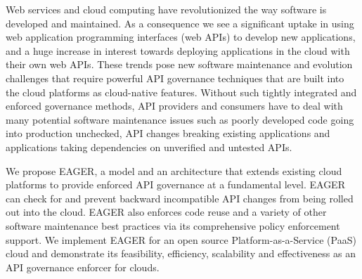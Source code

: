 Web services and cloud computing have
revolutionized the way software is developed and maintained. As a consequence we see
a significant uptake in using web application programming interfaces (web APIs) to develop
new applications, and a huge increase in interest towards deploying applications in the cloud
with their own web APIs. These trends pose new software maintenance and
evolution challenges that require powerful API governance techniques that are
built into the cloud platforms as cloud-native features. Without such tightly integrated 
and enforced governance methods, API providers and consumers have to deal with
many potential software maintenance issues such as poorly developed
code going into production unchecked, API changes breaking existing 
applications and applications taking dependencies on unverified and untested APIs.

We propose EAGER, a model and an architecture that extends existing cloud platforms
to provide enforced API governance at a fundamental level. EAGER can check for and
prevent backward incompatible API changes from being rolled out into the cloud. EAGER
also enforces code reuse and a variety of other software maintenance best practices
via its comprehensive policy enforcement support. We implement EAGER for an open source
Platform-as-a-Service (PaaS) cloud and demonstrate its feasibility, efficiency, scalability and
effectiveness as an API governance enforcer for clouds.